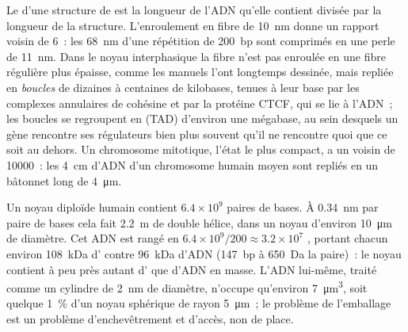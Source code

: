 \begin{proposition}\label{prop:b3:chromatin-epigenetics:compaction}
Le \emph{} d'une structure de  est la
longueur de l'ADN qu'elle contient divisée par la longueur de la
structure. L'enroulement en fibre de \qty{10}{nm} donne un rapport
voisin de $6$~: les \qty{68}{nm} d'une répétition de \qty{200}{bp}
sont comprimés en une perle de \qty{11}{nm}. Dans le noyau
interphasique la fibre n'est pas enroulée en une fibre régulière plus
épaisse, comme les manuels l'ont longtemps dessinée, mais repliée en
\emph{boucles} de dizaines à centaines de kilobases, tenues à leur
base par les complexes annulaires de cohésine et par la protéine CTCF,
qui se lie à l'ADN~; les boucles se regroupent en \emph{} (TAD) d'environ une mégabase, au sein
desquels un gène rencontre ses régulateurs bien plus souvent qu'il ne
rencontre quoi que ce soit au dehors. Un chromosome mitotique, l'état
le plus compact, a un  voisin de \num{10000}~: les
\qty{4}{cm} d'ADN d'un chromosome humain moyen sont repliés en un
bâtonnet long de \qty{4}{\micro m}.
\end{proposition}

\begin{example}\label{ex:b3:chromatin-epigenetics:two-metres}
Un noyau diploïde humain contient $6.4\times 10^{9}$ paires de bases. À
\qty{0.34}{nm} par paire de bases cela fait \qty{2.2}{m} de double
hélice, dans un noyau d'environ \qty{10}{\micro m} de diamètre. Cet ADN
est rangé en $6.4\times 10^{9}/200 \approx 3.2\times 10^{7}$
, portant chacun environ \qty{108}{kDa} d' contre
\qty{96}{kDa} d'ADN (\qty{147}{bp} à \qty{650}{Da} la paire)~: le noyau
contient à peu près autant d' que d'ADN en masse. L'ADN
lui-même, traité comme un cylindre de \qty{2}{nm} de diamètre, n'occupe
qu'environ \qty{7}{\micro m^3}, soit quelque \qty{1}{\%} d'un noyau
sphérique de rayon \qty{5}{\micro m}~; le problème de l'emballage est
un problème d'enchevêtrement et d'accès, non de place.
\end{example}

